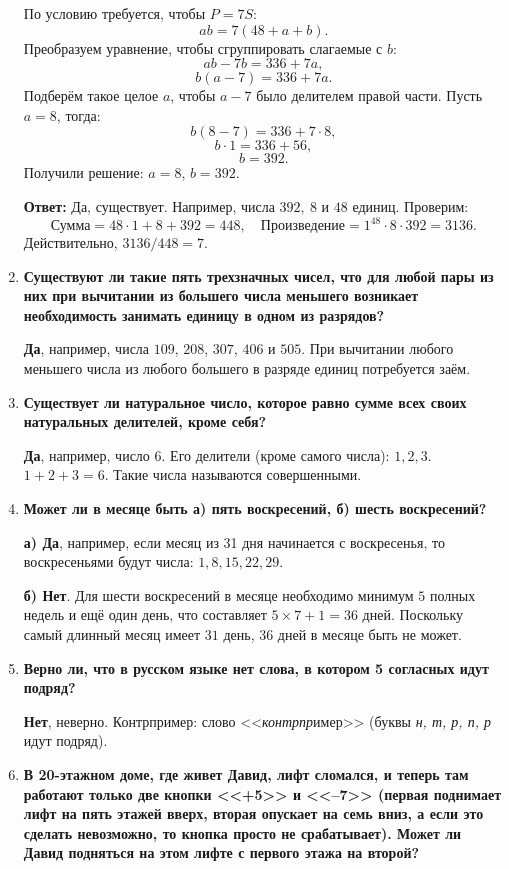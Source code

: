 \documentclass[12pt, a4paper]{article}
\begin{document}
\begin{enumerate}[label=\arabic*., wide=0pt, leftmargin=*]
    По условию требуется, чтобы $P = 7S$:
    \[
    ab = 7(48 + a + b).
    \]
    Преобразуем уравнение, чтобы сгруппировать слагаемые с $b$:
    \[
    ab - 7b = 336 + 7a,
    \]
    \[
    b(a - 7) = 336 + 7a.
    \]
    Подберём такое целое $a$, чтобы $a-7$ было делителем правой части. Пусть $a = 8$, тогда:
    \[
    b(8 - 7) = 336 + 7 \cdot 8,
    \]
    \[
    b \cdot 1 = 336 + 56,
    \]
    \[
    b = 392.
    \]
    Получили решение: $a=8$, $b=392$.

    \textbf{Ответ:} Да, существует. Например, числа $392,\ 8$ и $48$ единиц. Проверим:
    \[
    \text{Сумма} = 48 \cdot 1 + 8 + 392 = 448, \quad \text{Произведение} = 1^{48} \cdot 8 \cdot 392 = 3136.
    \]
    Действительно, $3136 / 448 = 7$.

    \item \textbf{Существуют ли такие пять трехзначных чисел, что для любой пары из них при вычитании из большего числа меньшего возникает необходимость занимать единицу в одном из разрядов?}

    \textbf{Да}, например, числа $109$, $208$, $307$, $406$ и $505$. При вычитании любого меньшего числа из любого большего в разряде единиц потребуется заём.

    \item \textbf{Существует ли натуральное число, которое равно сумме всех своих натуральных делителей, кроме себя?}

    \textbf{Да}, например, число $6$. Его делители (кроме самого числа): $1, 2, 3$. $1 + 2 + 3 = 6$. Такие числа называются совершенными.

    \item \textbf{Может ли в месяце быть а) пять воскресений, б) шесть воскресений?}

    \textbf{а) Да}, например, если месяц из 31 дня начинается с воскресенья, то воскресеньями будут числа: $1, 8, 15, 22, 29$.

    \textbf{б) Нет}. Для шести воскресений в месяце необходимо минимум $5$ полных недель и ещё один день, что составляет $5 \times 7 + 1 = 36$ дней. Поскольку самый длинный месяц имеет $31$ день, $36$ дней в месяце быть не может.

    \item \textbf{Верно ли, что в русском языке нет слова, в котором 5 согласных идут подряд?}

    \textbf{Нет}, неверно. Контрпример: слово <<\emph{контрпр}имер>> (буквы \emph{н, т, р, п, р} идут подряд).

    \item \textbf{В 20-этажном доме, где живет Давид, лифт сломался, и теперь там работают только две кнопки <<+5>> и <<–7>> (первая поднимает лифт на пять этажей вверх, вторая опускает на семь вниз, а если это сделать невозможно, то кнопка просто не срабатывает). Может ли Давид подняться на этом лифте с первого этажа на второй?}


\end{enumerate}
\end{document}
